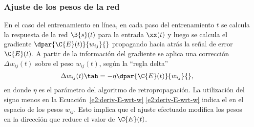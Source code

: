 %
\subsubsection{Ajuste de los pesos de la red}
%
En el caso del entrenamiento en línea, en cada paso del entrenamiento
$t$ se calcula la respuesta de la red  
$\B{s}(t)$ para la entrada $\xx(t)$ y luego se calcula el gradiente
$\dpar{\C{E}(t)}{w_{ij}}{}$ propagando hacia atrás la señal de error $\C{E}(t)$.
A partir de la información del gradiente
se aplica una corrección $\Delta{}w_{ij}(t)$ sobre el peso
$w_{ij}(t)$, según la ``regla delta''
%
\begin{align}
\label{e2:delta-rule}
  \Delta w_{ij}(t)\tab=-\eta\dpar{\C{E}(t)}{w_{ij}}{},
\end{align}
%
en donde $\eta$ es el parámetro  del
algoritmo de retropropagación. La utilización del signo menos en la
\iflatexml{}Ecuación~\ref{e2:deriv-E-wrt-w}
\else\autoref{e2:deriv-E-wrt-w}\fi{} indica el  en el espacio de los pesos $w_{ij}$. Esto implica que el
ajuste efectuado modifica los pesos en la dirección que reduce el
valor de $\C{E}(t)$.
